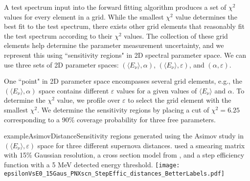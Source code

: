 

A test spectrum input into the forward fitting algorithm produces a set of $\chi^2$ values for every element in a grid. While the smallest $\chi^2$ value determines the best fit to the test spectrum, there exists other grid elements that reasonably fit the test spectrum according to their $\chi^2$ values. The collection of these grid elements help determine the parameter measurement uncertainty, and we represent this using ``sensitivity regions" in 2D spectral parameter space. We can use three sets of 2D parameter spaces: $(\langle E_\nu \rangle, \alpha)$, $(\langle E_\nu \rangle, \varepsilon)$, and $(\alpha, \varepsilon)$.

One ``point" in 2D parameter space encompasses several grid elements,
e.g., the $(\langle E_\nu \rangle, \alpha)$ space contains different
$\varepsilon$ values for a given values of $\langle E_\nu \rangle$ and
$\alpha$. To determine the $\chi^2$ value, we profile over
$\varepsilon$ to select the grid element with the smallest
$\chi^2$. We determine the sensitivity regions by placing a cut of
$\chi^2 = 6.25$ corresponding to a 90\% coverage probability for three
free parameters.

\begin{dunefigure}{exampleAsimovDistance}{Sensitivity regions generated using
    the Asimov study in $(\langle E_\nu \rangle, \varepsilon)$ space
    for three different supernova distances.   used a
    smearing matrix with 15\% Gaussian resolution, a cross section
    model from , and a step efficiency function with a 5 MeV
    detected energy threshold.}
	\texttt{[image: epsilonVsE0\_15Gaus\_PNXscn\_StepEffic\_distances\_BetterLabels.pdf]}
  \end{dunefigure}


